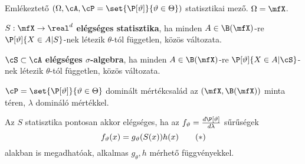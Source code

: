 \documentclass[aspectratio=169,notheorems,9pt,\option]{beamer}
\begin{document}
\maketitle

\begin{frame}{Emlékeztető}
  $(\Omega,\cA,\cP=\set{\P[\theta]}{\theta\in\Theta})$ statisztikai mező. $\Omega=\mfX$.  
  \begin{df} 
    $S:\mfX\to\real^d$ \textbf{elégséges statisztika}, ha minden $A\in\B(\mfX)$-re $\P[\theta]{X\in A|S}$-nek 
    létezik $\theta$-tól független, közös változata.

    $\cS\subset\cA$ \textbf{elégséges $\sigma$-algebra}, ha minden $A\in\B(\mfX)$-re $\P[\theta]{X\in A|\cS}$-nek 
    létezik $\theta$-tól független, közös változata.
  \end{df}
  \begin{theorem}
    $\cP=\set{\P[\theta]}{\theta\in\Theta}$ dominált mértékcsalád az 
    $(\mfX,\B(\mfX))$ minta téren, $\lambda$ domináló mértékkel. 
    
    Az $S$  statisztika pontosan akkor elégséges, ha az 
    $f_\theta=\frac{d\P[\theta]}{d\lambda}$ 
    sűrűségek
    \begin{displaymath}
      f_{\theta}(x)=g_{\theta}(S(x))h(x)  \tag{\hbox{${*}$}}
    \end{displaymath}
    alakban is megadhatóak, 
    alkalmas $g_\theta,h$ mérhető függvényekkel.
  \end{theorem}
  
\end{frame}
\end{document}
